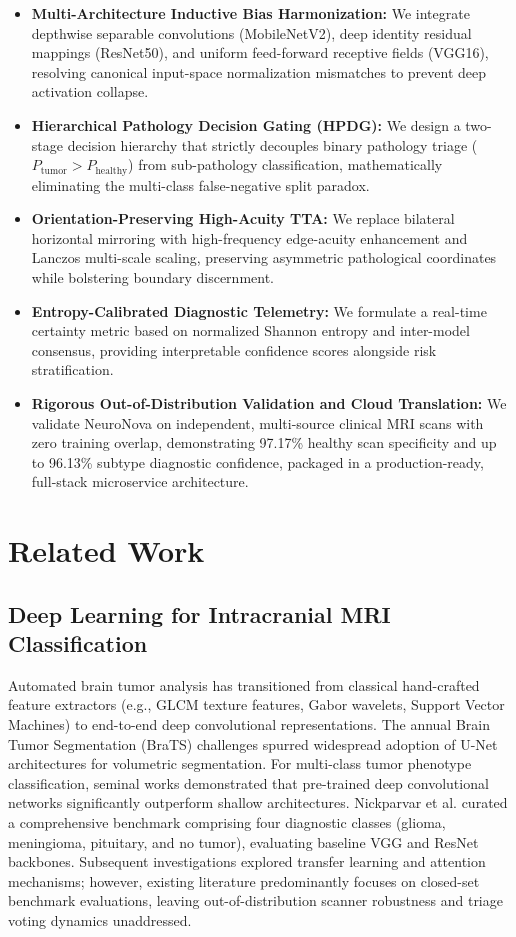 \documentclass[runningheads]{llncs}
\begin{document}
\begin{itemize}
    \item \textbf{Multi-Architecture Inductive Bias Harmonization:} We integrate depthwise separable convolutions (MobileNetV2), deep identity residual mappings (ResNet50), and uniform feed-forward receptive fields (VGG16), resolving canonical input-space normalization mismatches to prevent deep activation collapse.
    \item \textbf{Hierarchical Pathology Decision Gating (HPDG):} We design a two-stage decision hierarchy that strictly decouples binary pathology triage ($P_{\text{tumor}} > P_{\text{healthy}}$) from sub-pathology classification, mathematically eliminating the multi-class false-negative split paradox.
    \item \textbf{Orientation-Preserving High-Acuity TTA:} We replace bilateral horizontal mirroring with high-frequency edge-acuity enhancement and Lanczos multi-scale scaling, preserving asymmetric pathological coordinates while bolstering boundary discernment.
    \item \textbf{Entropy-Calibrated Diagnostic Telemetry:} We formulate a real-time certainty metric based on normalized Shannon entropy and inter-model consensus, providing interpretable confidence scores alongside risk stratification.
    \item \textbf{Rigorous Out-of-Distribution Validation and Cloud Translation:} We validate NeuroNova on independent, multi-source clinical MRI scans with zero training overlap, demonstrating 97.17\% healthy scan specificity and up to 96.13\% subtype diagnostic confidence, packaged in a production-ready, full-stack microservice architecture.
\end{itemize}

\section{Related Work}
\subsection{Deep Learning for Intracranial MRI Classification}
Automated brain tumor analysis has transitioned from classical hand-crafted feature extractors (e.g., GLCM texture features, Gabor wavelets, Support Vector Machines) to end-to-end deep convolutional representations. The annual Brain Tumor Segmentation (BraTS) challenges spurred widespread adoption of U-Net architectures for volumetric segmentation. For multi-class tumor phenotype classification, seminal works demonstrated that pre-trained deep convolutional networks significantly outperform shallow architectures. Nickparvar et al. curated a comprehensive benchmark comprising four diagnostic classes (glioma, meningioma, pituitary, and no tumor), evaluating baseline VGG and ResNet backbones. Subsequent investigations explored transfer learning and attention mechanisms; however, existing literature predominantly focuses on closed-set benchmark evaluations, leaving out-of-distribution scanner robustness and triage voting dynamics unaddressed.
\end{document}
